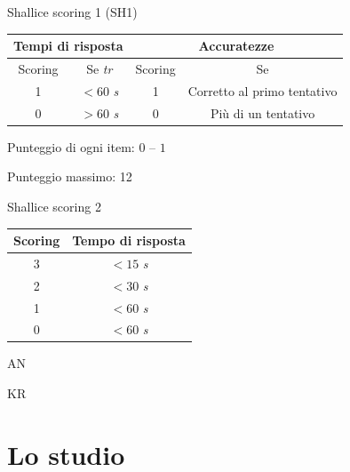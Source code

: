 \documentclass{beamer}
\begin{document}
\begin{frame}

		\begin{alertblock}{Shallice scoring 1 (SH1)}
\small{
	\begin{tabular}{c c c c}
	\hline
	\multicolumn{2}{c}{Tempi di risposta} & \multicolumn{2}{c}{Accuratezze} \\
	\hline
	Scoring & Se \emph{tr} & Scoring & Se \\\hline
	1 & $< 60$ \emph{s} & 1 & Corretto al primo tentativo \\
	0 & $> 60$ \emph{s} & 0 & Più di un tentativo \\ \hline
\end{tabular}
}
					
			
			Punteggio di ogni item: $0$ -- $1$
			
			Punteggio massimo: 12

		
		
			
					\end{alertblock}
		
				\begin{exampleblock}{Shallice scoring 2}
		\scriptsize
		
\begin{tabular}{c c}
	\hline
	Scoring & Tempo di risposta \\ \hline
	3 & $< 15$ \emph{s} \\
	2 & $< 30$ \emph{s} \\
	1 & $< 60$ \emph{s} \\
	0 & $< 60$ \emph{s} \\
	\hline
\end{tabular}
				\end{exampleblock}
		

				\begin{exampleblock}{AN}
			
		\end{exampleblock}
		
		\begin{alertblock}{KR}
			
		\end{alertblock}


\end{frame}

\section{Lo studio}
	
\end{document}
